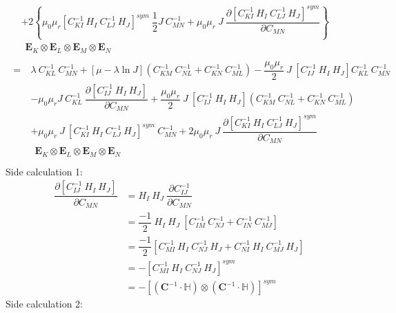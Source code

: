 \begin{align*}
\begin{split}
&+ 2 \left\lbrace \mu_0 \mu_r [C^{-1}_{KI} \ H_I \ C^{-1}_{LJ} \ H_J]^{sym} \ \dfrac{1}{2} J \ C^{-1}_{MN} + \mu_0 \mu_r \ J \ \dfrac{\partial [C^{-1}_{KI} \ H_I \ C^{-1}_{LJ} \ H_J]^{sym}}{\partial C_{MN}} \right\rbrace \\
& \ \ \mathbf{E}_K \otimes \mathbf{E}_L \otimes \mathbf{E}_M \otimes \mathbf{E}_N
\end{split}\\
\begin{split}
=\ & \lambda \ C^{-1}_{KL} \ C^{-1}_{MN} + [\mu - \lambda \ln J] \left( C^{-1}_{KM} \ C^{-1}_{NL} + C^{-1}_{KN} \ C^{-1}_{ML} \right) - \dfrac{\mu_0 \mu_r}{2} \ J \ [C^{-1}_{IJ} \ H_I \ H_J] C^{-1}_{KL} \ C^{-1}_{MN}  \\
&- \mu_0 \mu_r J \ C^{-1}_{KL} \ \dfrac{\partial [C^{-1}_{IJ} \ H_I \ H_J]}{\partial C_{MN}} + \dfrac{\mu_0 \mu_r}{2} \ J \ [C^{-1}_{IJ} \ H_I \ H_J] (C^{-1}_{KM} \ C^{-1}_{NL} + C^{-1}_{KN} \ C^{-1}_{ML}) \\
&+ \mu_0 \mu_r \ J \ [C^{-1}_{KI} \ H_I \ C^{-1}_{LJ} \ H_J]^{sym} \ C^{-1}_{MN} + 2 \mu_0 \mu_r \ J \ \dfrac{\partial [C^{-1}_{KI} \ H_I \ C^{-1}_{LJ} \ H_J]^{sym}}{\partial C_{MN}} \\
& \ \ \mathbf{E}_K \otimes \mathbf{E}_L \otimes \mathbf{E}_M \otimes \mathbf{E}_N
\end{split}\\
\end{align*}
Side calculation 1:
\begin{align*}
\dfrac{\partial [C^{-1}_{IJ} \ H_I \ H_J]}{\partial C_{MN}} &= H_I \ H_J \ \dfrac{\partial C^{-1}_{IJ}}{\partial C_{MN}}\\
&= \dfrac{-1}{2} \ H_I \ H_J \ [C^{-1}_{IM} \ C^{-1}_{NJ} + C^{-1}_{IN} \ C^{-1}_{MJ}]\\
&= \dfrac{-1}{2} [C^{-1}_{MI} \ H_I \ C^{-1}_{NJ} \ H_J + C^{-1}_{NI} \ H_I \ C^{-1}_{MJ} \ H_J]\\
&= - [C^{-1}_{MI} \ H_I \ C^{-1}_{NJ} \ H_J]^{sym}\\
&= - [ (\mathbf{C}^{-1} \cdot \mathbb{H}) \otimes (\mathbf{C}^{-1} \cdot \mathbb{H}) ]^{sym}
\end{align*}
Side calculation 2:
